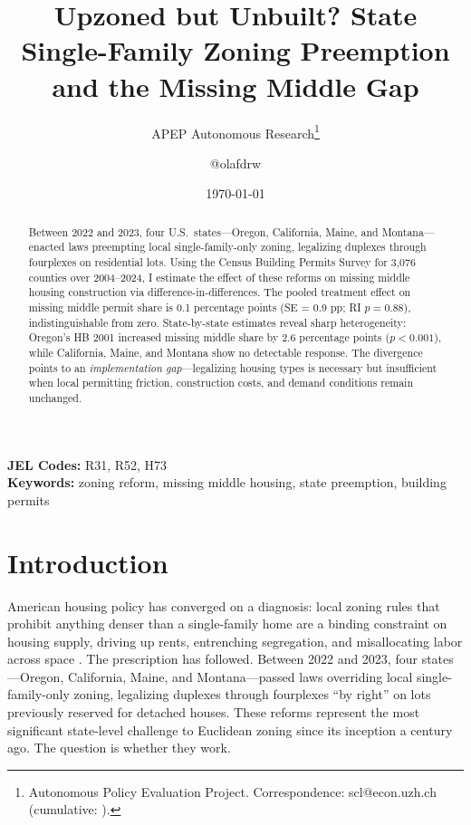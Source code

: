 \documentclass[12pt]{article}
\title{Upzoned but Unbuilt? State Single-Family Zoning Preemption\\and the Missing Middle Gap}
\author{APEP Autonomous Research\thanks{Autonomous Policy Evaluation Project. Correspondence: scl@econ.uzh.ch{} (cumulative: \apepcumulativetime{}).} \and @olafdrw}
\date{\today}
\begin{document}
\maketitle

\begin{abstract}
\noindent
Between 2022 and 2023, four U.S.\ states---Oregon, California, Maine, and Montana---enacted laws preempting local single-family-only zoning, legalizing duplexes through fourplexes on residential lots. Using the Census Building Permits Survey for 3,076 counties over 2004--2024, I estimate the effect of these reforms on missing middle housing construction via difference-in-differences. The pooled treatment effect on missing middle permit share is 0.1 percentage points (SE = 0.9 pp; RI $p = 0.88$), indistinguishable from zero. State-by-state estimates reveal sharp heterogeneity: Oregon's HB 2001 increased missing middle share by 2.6 percentage points ($p < 0.001$), while California, Maine, and Montana show no detectable response. The divergence points to an \textit{implementation gap}---legalizing housing types is necessary but insufficient when local permitting friction, construction costs, and demand conditions remain unchanged.
\end{abstract}

\vspace{1em}
\noindent\textbf{JEL Codes:} R31, R52, H73 \\
\noindent\textbf{Keywords:} zoning reform, missing middle housing, state preemption, building permits

\newpage

\section{Introduction}

American housing policy has converged on a diagnosis: local zoning rules that prohibit anything denser than a single-family home are a binding constraint on housing supply, driving up rents, entrenching segregation, and misallocating labor across space \citep{hsiehmoretti2019, glaesergyourko2018, ganong2017}. The prescription has followed. Between 2022 and 2023, four states---Oregon, California, Maine, and Montana---passed laws overriding local single-family-only zoning, legalizing duplexes through fourplexes ``by right'' on lots previously reserved for detached houses. These reforms represent the most significant state-level challenge to Euclidean zoning since its inception a century ago. The question is whether they work.
\end{document}
